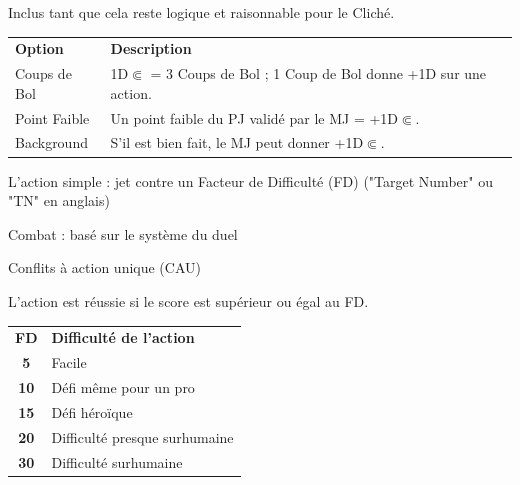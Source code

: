 \begin{frame}[t]
{\vspace{0.2cm}


Inclus tant que cela reste logique et raisonnable pour le Cliché.


\vspace{0.2cm}

\begin{tabular}{p{2cm}p{6.3cm}}
\textbf{Option}    & \textbf{Description}  \\
Coups de Bol & 1D$\Subset$ = 3 Coups de Bol ; 1 Coup de Bol donne +1D sur une action. \\
Point Faible & Un point faible du PJ validé par le MJ = +1D$\Subset$. \\
Background   & S'il est bien fait, le MJ peut donner +1D$\Subset$. \\
\end{tabular}

\vspace{0.2cm}


\begin{myitemize}
\item L'action simple : jet contre un Facteur de Difficulté (FD) ("Target Number" ou "TN" en anglais)
\item Combat : basé sur le système du duel
\item Conflits à action unique (CAU)
\end{myitemize}


L'action est réussie si le score est supérieur ou égal au FD.

\begin{table}
\begin{tabular}{cl}
\textbf{FD} & \textbf{Difficulté de l'action} \\
\textbf{5} & Facile                          \\
\textbf{10} & Défi même pour un pro           \\
\textbf{15} & Défi héroïque                   \\
\textbf{20} & Difficulté presque surhumaine   \\
\textbf{30} & Difficulté surhumaine           \\
\end{tabular}
\end{table}

}
\end{frame}
